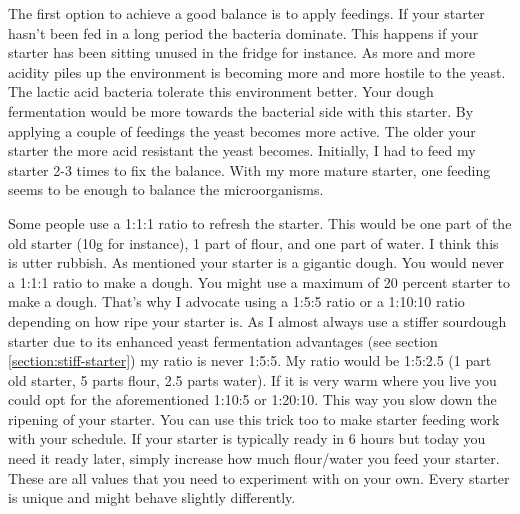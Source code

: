 The first option to achieve a good balance is to apply feedings.
If your starter hasn't been fed in a long period the
bacteria dominate. This happens if your starter has been
sitting unused in the fridge for instance. As more and more
acidity piles up the environment is becoming more and more hostile
to the yeast. The lactic acid bacteria tolerate this environment
better. Your dough fermentation would be more towards the
bacterial side with this starter. By applying a couple of
feedings the yeast becomes more active. The older your
starter the more acid resistant the yeast becomes. Initially,
I had to feed my starter 2-3 times to fix the balance. With my
more mature starter, one feeding seems to be enough to balance
the microorganisms.

Some people use a 1:1:1 ratio to refresh the starter. This would
be one part of the old starter (10g for instance), 1 part of flour,
and one part of water. I think this is utter rubbish. As mentioned
your starter is a gigantic dough. You would never a 1:1:1 ratio to
make a dough. You might use a maximum of 20 percent starter to
make a dough. That's why I advocate using a 1:5:5 ratio or a
1:10:10 ratio depending on how ripe your starter is. As I almost
always use a stiffer sourdough starter due to its enhanced
yeast fermentation advantages (see section \ref{section:stiff-starter})
my ratio is never 1:5:5. My ratio would be 1:5:2.5 (1 part old starter,
5 parts flour, 2.5 parts water). If it is very warm where you live
you could opt for the aforementioned 1:10:5 or 1:20:10. This
way you slow down the ripening of your starter. You can use this
trick too to make starter feeding work with your schedule.
If your starter is typically ready in 6 hours but today you need it
ready later, simply increase how much flour/water you feed your starter.
These are all values that you need to experiment with on your own.
Every starter is unique and might behave slightly differently.

